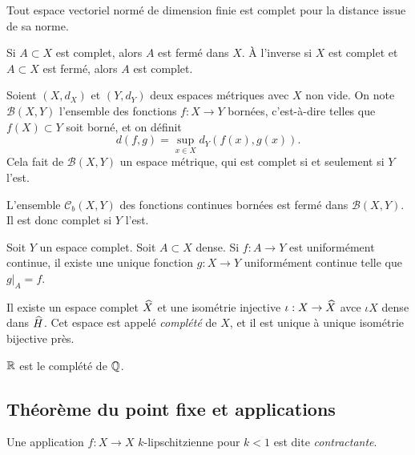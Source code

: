 \documentclass[twocolumn, landscape]{article}
\begin{document}
\begin{coro}
    Tout espace vectoriel normé de dimension finie est complet pour la distance issue de sa norme.
\end{coro}

\begin{prop}
    Si $A \subset X$ est complet, alors $A$ est fermé dans $X$. À l'inverse si $X$ est complet et $A\subset X$ est fermé, alors $A$ est complet. 
\end{prop}

\begin{prop}
    Soient $(X, d_X)$ et $(Y, d_Y)$ deux espaces métriques avec $X$ non vide. On note $\mathscr{B}(X, Y)$ l'ensemble des fonctions $f:X\to Y$ bornées, c'est-à-dire telles que $f(X) \subset Y$ soit borné, et on définit
    $$d(f,g) = \sup_{x\in X} d_Y(f(x), g(x)).$$
    Cela fait de $\mathscr{B}(X,Y)$ un espace métrique, qui est complet si et seulement si $Y$ l'est. 
\end{prop}

\begin{prop}
    L'ensemble $\mathscr{C}_b(X,Y)$ des fonctions continues bornées est fermé dans $\mathscr{B}(X,Y)$. Il est donc complet si $Y$ l'est. 
\end{prop}

\begin{prop}
    Soit $Y$ un espace complet. Soit $A \subset X$ dense. Si $f : A \to Y$ est uniformément continue, il existe une unique fonction $g: X\to Y$ uniformément continue telle que $g|_A = f$.
\end{prop}

\begin{prop}
    Il existe un espace complet $\widehat{X}$ et une isométrie injective $\iota : X \to \widehat{X}$ avce $\iota{X}$ dense dans $\widehat{H}$. Cet espace est appelé \emph{complété} de $X$, et il est unique à unique isométrie bijective près.  
\end{prop}

\begin{exem}
    $\mathbb{R}$ est le complété de $\mathbb{Q}$.
\end{exem}

\subsection{Théorème du point fixe et applications \cite{Demailly}}

\begin{defi}
    Une application $f: X\to X$ $k$-lipschitzienne pour $k<1$ est dite \emph{contractante}.
\end{defi}
\end{document}

